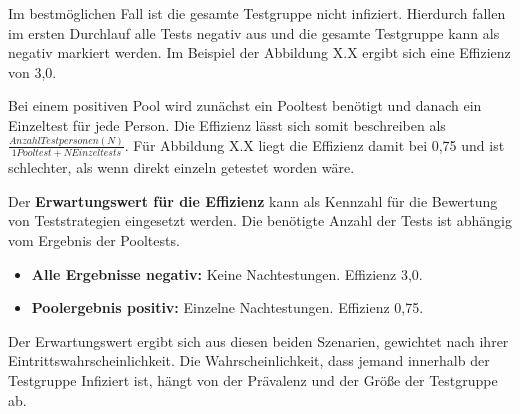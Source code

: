 Im bestmöglichen Fall ist die gesamte Testgruppe nicht infiziert.
Hierdurch fallen im ersten Durchlauf alle Tests negativ aus und die gesamte Testgruppe kann als negativ markiert werden.
Im Beispiel der Abbildung X.X ergibt sich eine Effizienz von 3,0.

Bei einem positiven Pool wird zunächst ein Pooltest benötigt und danach ein Einzeltest für jede Person.
Die Effizienz lässt sich somit beschreiben als $\frac{Anzahl Testpersonen (N)}{1 Pooltest + N Einzeltests} $.
Für Abbildung X.X liegt die Effizienz damit bei 0,75 und ist schlechter, als wenn direkt einzeln getestet worden wäre.

Der \textbf{Erwartungswert für die Effizienz} kann als Kennzahl für die Bewertung von Teststrategien eingesetzt werden.
Die benötigte Anzahl der Tests ist abhängig vom Ergebnis der Pooltests.
\begin{itemize}
	\item \textbf{Alle Ergebnisse negativ:} Keine Nachtestungen. Effizienz 3,0. 
	\item \textbf{Poolergebnis positiv:} Einzelne Nachtestungen. Effizienz 0,75.
\end{itemize}
Der Erwartungswert ergibt sich aus diesen beiden Szenarien, gewichtet nach ihrer Eintrittswahrscheinlichkeit.
Die Wahrscheinlichkeit, dass jemand innerhalb der Testgruppe Infiziert ist, hängt von der Prävalenz und der Größe der Testgruppe ab.
\cleardoublepage
